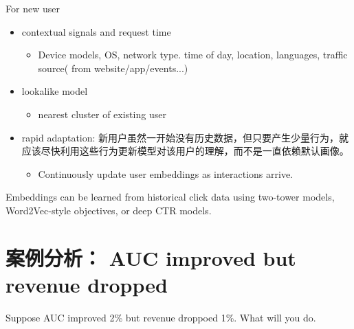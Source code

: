 For new user
\begin{itemize}
    \item contextual signals and request time
    \begin{itemize}
        \item Device models, OS, network type. time of day, location, languages, traffic source( from website/app/events...)
    \end{itemize}

    \item lookalike model
    \begin{itemize}
        \item nearest cluster of existing user
    \end{itemize}

    \item rapid adaptation: 新用户虽然一开始没有历史数据，但只要产生少量行为，就应该尽快利用这些行为更新模型对该用户的理解，而不是一直依赖默认画像。
    \begin{itemize}
        \item Continuously update user embeddings as interactions arrive.
    \end{itemize}
\end{itemize}

Embeddings can be learned from historical click data using two-tower models, Word2Vec-style objectives, or deep CTR models.

\section{案例分析： AUC improved  but revenue dropped}
Suppose AUC improved 2\% but revenue droppoed 1\%. What will you do.

